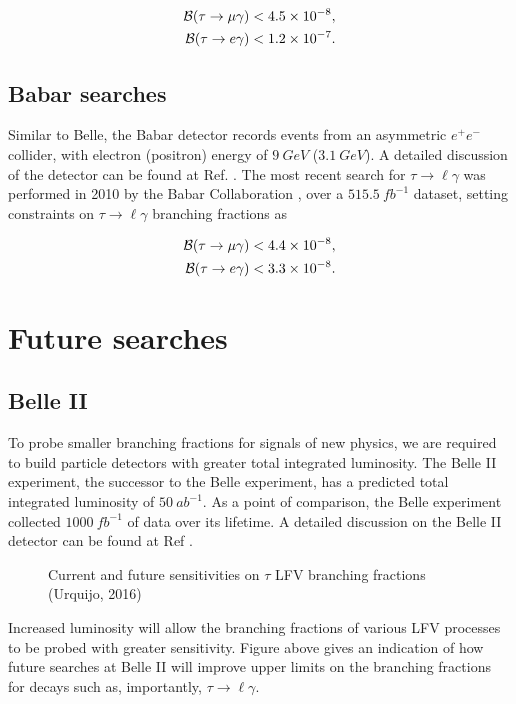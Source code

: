 \documentclass[12pt]{thesis}  %
\newcommand{\br}{\mathcal{B}}
\newcommand{\tmg}{\tau\to\mu\gamma}
\newcommand{\tlg}{\tau\to\ell\gamma}
\begin{document}
\begin{align}
\br(\tmg)&<\num{4.5d-8},\\
\br(\tau\to e \gamma)&<\num{1.2d-7}.
\end{align}


\subsection{Babar searches}

Similar to Belle, the Babar detector records events from an asymmetric $e^+e^-$ collider, with electron (positron) energy of $\SI{9}{GeV}$ ($\SI{3.1}{GeV}$). A detailed discussion of the detector can be found at Ref. \cite{Babar:2002}. The most recent search for $\tlg$ was performed in 2010 by the Babar Collaboration \cite{Babar:2010}, over a $\SI{515.5}{fb^{-1}}$ dataset, setting constraints on $\tlg$ branching fractions as

\begin{align}
\br(\tmg)&<\num{4.4d-8},\\
\br(\tau\to e \gamma)&<\num{3.3d-8}.
\end{align}



\section{Future searches}

\subsection{Belle II}

To probe smaller branching fractions for signals of new physics, we are required to build particle detectors with greater total integrated luminosity. The Belle II experiment, the successor to the Belle experiment, has a predicted total integrated luminosity of $\SI{50}{ab^{-1}}$. As a point of comparison, the Belle experiment collected $\SI{1000}{fb^{-1}}$ of data over its lifetime. A detailed discussion on the Belle II detector can be found at Ref \cite{Belle:2010}.

\begin{figure}[h]
\centering
\caption{Current and future sensitivities on $\tau$ LFV branching fractions (Urquijo, 2016)}
\end{figure}

Increased luminosity will allow the branching fractions of various LFV processes to be probed with greater sensitivity. Figure above gives an indication of how future searches at Belle II will improve upper limits on the branching fractions for decays such as, importantly, $\tlg$.
\end{document}
